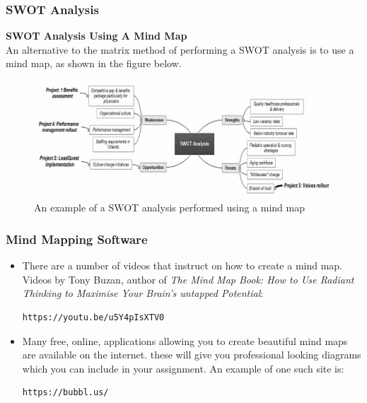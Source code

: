 \documentclass[aspectratio=169]{beamer}
\begin{document}
\begin{frame}
\frametitle{SWOT Analysis}
\textbf{SWOT Analysis Using A Mind Map}\\
An alternative to the matrix method of performing a SWOT analysis is to use a mind map, as shown in the figure below.
\begin{figure}
\includegraphics[scale=0.5]{swot_mind_map}
\caption{An example of a SWOT analysis performed using a mind map}
\end{figure}
\end{frame}

\begin{frame}[fragile]
\frametitle{Mind Mapping Software}
\begin{itemize}
\item There are a number of videos that instruct on how to create a mind map. Videos by Tony Buzan, author of \textit{The Mind Map Book: How to Use Radiant Thinking to Maximise Your Brain's untapped Potential}:\\
\begin{center}
\begin{verbatim}https://youtu.be/u5Y4pIsXTV0\end{verbatim}
\end{center}
\vspace{0.5cm}
\item Many free, online, applications allowing you to create beautiful mind maps are available on the internet. these will give you professional looking diagrams which you can include in your assignment. An example of one such site is:\\
\begin{center}
\begin{verbatim}https://bubbl.us/\end{verbatim}
\end{center}
\end{itemize}
\end{frame}
\end{document}
